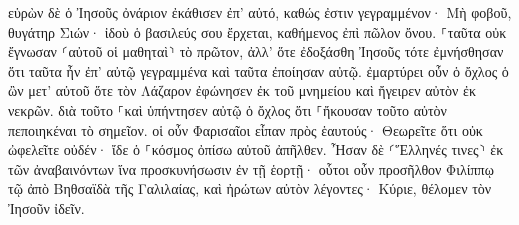 \documentclass{openreader}
\begin{document}
εὑρὼν δὲ ὁ Ἰησοῦς ὀνάριον ἐκάθισεν ἐπ’ αὐτό, καθώς ἐστιν γεγραμμένον· 
Μὴ φοβοῦ, θυγάτηρ Σιών· ἰδοὺ ὁ βασιλεύς σου ἔρχεται, καθήμενος ἐπὶ πῶλον ὄνου. 
⸀ταῦτα οὐκ ἔγνωσαν ⸂αὐτοῦ οἱ μαθηταὶ⸃ τὸ πρῶτον, ἀλλ’ ὅτε ἐδοξάσθη Ἰησοῦς τότε ἐμνήσθησαν ὅτι ταῦτα ἦν ἐπ’ αὐτῷ γεγραμμένα καὶ ταῦτα ἐποίησαν αὐτῷ. 
ἐμαρτύρει οὖν ὁ ὄχλος ὁ ὢν μετ’ αὐτοῦ ὅτε τὸν Λάζαρον ἐφώνησεν ἐκ τοῦ μνημείου καὶ ἤγειρεν αὐτὸν ἐκ νεκρῶν. 
διὰ τοῦτο ⸀καὶ ὑπήντησεν αὐτῷ ὁ ὄχλος ὅτι ⸀ἤκουσαν τοῦτο αὐτὸν πεποιηκέναι τὸ σημεῖον. 
οἱ οὖν Φαρισαῖοι εἶπαν πρὸς ἑαυτούς· Θεωρεῖτε ὅτι οὐκ ὠφελεῖτε οὐδέν· ἴδε ὁ ⸀κόσμος ὀπίσω αὐτοῦ ἀπῆλθεν. 
Ἦσαν δὲ ⸂Ἕλληνές τινες⸃ ἐκ τῶν ἀναβαινόντων ἵνα προσκυνήσωσιν ἐν τῇ ἑορτῇ· 
οὗτοι οὖν προσῆλθον Φιλίππῳ τῷ ἀπὸ Βηθσαϊδὰ τῆς Γαλιλαίας, καὶ ἠρώτων αὐτὸν λέγοντες· Κύριε, θέλομεν τὸν Ἰησοῦν ἰδεῖν. 
\end{document}
